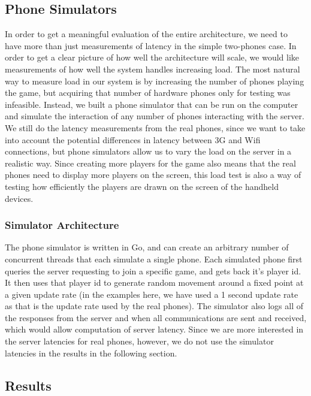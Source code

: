 \documentclass{acm_proc_article-sp}
\begin{document}
\subsection{Phone Simulators}
In order to get a meaningful evaluation of the entire architecture, we
need to have more than just measurements of latency in the simple
two-phones case.  In order to get a clear picture of how well the
architecture will scale, we would like measurements of how well the
system handles increasing load.  The most natural way to measure load
in our system is by increasing the number of phones playing the game,
but acquiring that number of hardware phones only for testing was
infeasible.  Instead, we built a phone simulator that can be run on
the computer and simulate the interaction of any number of phones
interacting with the server. We still do the latency measurements from
the real phones, since we want to take into account the potential
differences in latency between 3G and Wifi connections, but phone
simulators allow us to vary the load on the server in a realistic
way. Since creating more players for the game also means that the real
phones need to display more players on the screen, this load test is
also a way of testing how efficiently the players are drawn on the
screen of the handheld devices.

\subsubsection{Simulator Architecture}
The phone simulator is written in Go, and can create an arbitrary
number of concurrent threads that each simulate a single phone.  Each
simulated phone first queries the server requesting to join a specific
game, and gets back it's player id.  It then uses that player id to
generate random movement around a fixed point at a given update rate
(in the examples here, we have used a 1 second update rate as that is
the update rate used by the real phones). The simulator also logs all
of the responses from the server and when all communications are sent
and received, which would allow computation of server latency.  Since
we are more interested in the server latencies for real phones,
however, we do not use the simulator latencies in the results in the
following section.

\subsection{Results}
\end{document}
